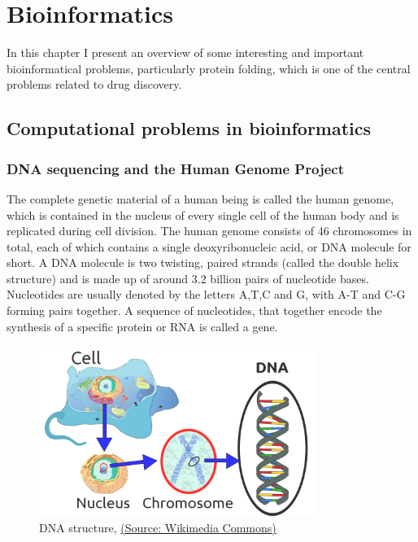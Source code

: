 \chapter{Bioinformatics}

In this chapter I present an overview of some interesting and important bioinformatical problems, particularly protein folding, which is one of the central problems related to drug discovery\cite{BockenhauerAlgoBioinfo}.

\section{Computational problems in bioinformatics}

\subsection{DNA sequencing and the Human Genome Project}

The complete genetic material of a human being is called the human genome, which is contained in the nucleus of every single cell of the human body and is replicated during cell division. The human genome consists of 46 chromosomes in total, each of which contains a single deoxyribonucleic acid, or DNA molecule for short. A DNA molecule is two twisting, paired strands (called the double helix structure) and is made up of around 3.2 billion pairs of nucleotide bases. Nucleotides are usually denoted by the letters A,T,C and G, with A-T and C-G forming pairs together. A sequence of nucleotides, that together encode the synthesis of a specific protein or RNA is called a gene.

\begin{figure}[H]
    \centering
    \includegraphics[width=0.8\textwidth]{figures/bioinformatics/dna.png}
    \caption{DNA structure, \href{https://commons.wikimedia.org/wiki/File:Eukaryote\_DNA-en.svg}{(Source: Wikimedia Commons)}}
\end{figure}

